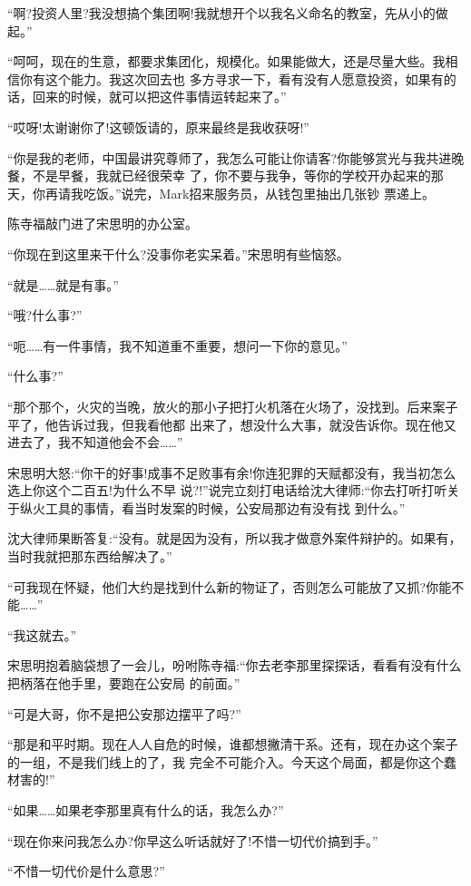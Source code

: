 \documentclass[11pt,a4paper,onecolumn]{article}
\begin{document}
``啊?投资人里?我没想搞个集团啊!我就想开个以我名义命名的教室，先从小的做起。''

``呵呵，现在的生意，都要求集团化，规模化。如果能做大，还是尽量大些。我相信你有这个能力。我这次回去也
多方寻求一下，看有没有人愿意投资，如果有的话，回来的时候，就可以把这件事情运转起来了。''

``哎呀!太谢谢你了!这顿饭请的，原来最终是我收获呀!''

``你是我的老师，中国最讲究尊师了，我怎么可能让你请客?你能够赏光与我共进晚餐，不是早餐，我就已经很荣幸
了，你不要与我争，等你的学校开办起来的那天，你再请我吃饭。''说完，Mark招来服务员，从钱包里抽出几张钞
票递上。

陈寺福敲门进了宋思明的办公室。

``你现在到这里来干什么?没事你老实呆着。''宋思明有些恼怒。

``就是……就是有事。''

``哦?什么事?''

``呃……有一件事情，我不知道重不重要，想问一下你的意见。''

``什么事?''

``那个那个，火灾的当晚，放火的那小子把打火机落在火场了，没找到。后来案子平了，他告诉过我，但我看他都
出来了，想没什么大事，就没告诉你。现在他又进去了，我不知道他会不会……''

宋思明大怒:``你干的好事!成事不足败事有余!你连犯罪的天赋都没有，我当初怎么选上你这个二百五!为什么不早
说?!''说完立刻打电话给沈大律师:``你去打听打听关于纵火工具的事情，看当时发案的时候，公安局那边有没有找
到什么。''

沈大律师果断答复:``没有。就是因为没有，所以我才做意外案件辩护的。如果有，当时我就把那东西给解决了。''

``可我现在怀疑，他们大约是找到什么新的物证了，否则怎么可能放了又抓?你能不能……''

``我这就去。''

宋思明抱着脑袋想了一会儿，吩咐陈寺福:``你去老李那里探探话，看看有没有什么把柄落在他手里，要跑在公安局
的前面。''

``可是大哥，你不是把公安那边摆平了吗?''

``那是和平时期。现在人人自危的时候，谁都想撇清干系。还有，现在办这个案子的一组，不是我们线上的了，我
完全不可能介入。今天这个局面，都是你这个蠢材害的!''

``如果……如果老李那里真有什么的话，我怎么办?''

``现在你来问我怎么办?你早这么听话就好了!不惜一切代价搞到手。''

``不惜一切代价是什么意思?''
\end{document}
